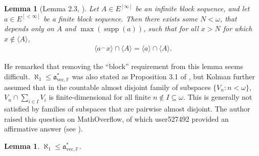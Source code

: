 \documentclass[10pt,a4paper]{amsart}
\theoremstyle{plain}
\numberwithin{equation}{section}
\newtheorem{lemma}[theorem]{Lemma}
\theoremstyle{definition}
\newcommand{\func}{\operatorname}
\renewcommand{\c}[1]{\langle #1 \rangle}
\renewcommand{\frak}{\mathfrak}
\newcommand{\supp}{\func{supp}}
\newcommand{\avec}{\frak{a}_{\mathrm{vec},\mathbb{F}}}
\begin{document}
\begin{lemma}[Lemma 2.3, \cite{S19}]
\label{lem:iteration.lemma.for.subspaces}
    Let $A \in E^{[\infty]}$ be an infinite block sequence, and let $a \in E^{[<\infty]}$ be a finite block sequence. Then there exists some $N < \omega$, that depends only on $A$ and $\max(\supp(a))$, such that for all $x > N$ for which $x \notin \c{A}$, 
    \begin{align*}
        \c{a^\frown x} \cap \c{A} = \c{a} \cap \c{A}.
    \end{align*}
\end{lemma}

He remarked that removing the ``block'' requirement from this lemma seems difficult. $\aleph_1 \leq \avec^*$ was also stated as Proposition 3.1 of \cite{K00}, but Kolman further assumed that in the countable almost disjoint family of subspaces $\{V_n : n < \omega\}$, $V_n \cap \sum_{i \in I} V_i$ is finite-dimensional for all finite $n \notin I \subseteq \omega$. This is generally not satisfied by families of subspaces that are pairwise almost disjoint. The author raised this question on MathOverflow, of which user527492 provided an affirmative answer (see \cite{u25}). 

\begin{lemma}
\label{lem:avec*.geq.aleph_1}
     $\aleph_1 \leq \avec^*$.
\end{lemma}
\end{document}
